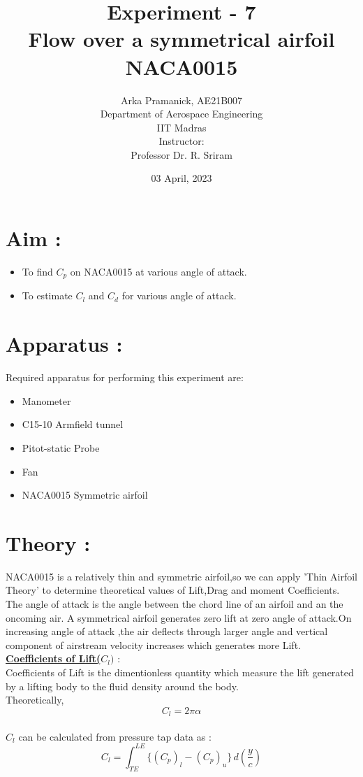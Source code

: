 \documentclass[12pt,a4paper]{article}
\title{{Experiment - 7\\ \textbf{Flow over a symmetrical airfoil NACA0015}}}
\author{Arka Pramanick, AE21B007\\ Department of Aerospace Engineering\\ IIT Madras\\[3ex] Instructor:\\ \large Professor Dr. R. Sriram}
\date{03 April, 2023}
\begin{document}
\maketitle

\hline

\section{Aim :}
\begin{itemize}
    \item To find $C_p$ on NACA0015 at various angle of attack.
    \item To estimate $C_l$ and $C_d$ for various angle of attack.
\end{itemize}


\section{Apparatus :}
Required apparatus for performing this experiment are:
\begin{itemize}
    \item Manometer
    \item C15-10 Armfield tunnel
    \item Pitot-static Probe
    \item Fan
    \item NACA0015 Symmetric airfoil
\end{itemize}



\newpage
\section{Theory :}

NACA0015 is a relatively thin and symmetric airfoil,so we can apply 'Thin Airfoil Theory' to determine theoretical values of Lift,Drag and moment Coefficients.
The angle of attack is the angle between the chord line of an airfoil and an the oncoming air. A symmetrical airfoil generates zero lift at zero angle of attack.On increasing angle of attack ,the air deflects through larger angle and vertical component of airstream velocity increases which generates more Lift.
\underline{\textbf{Coefficients of Lift($C_l)$}} :\\
Coefficients of Lift is the dimentionless quantity which measure the lift generated by a lifting body to the fluid density around the body.\\
Theoretically, $$C_l = 2 \pi\alpha$$ \\
$C_l$ can be calculated from pressure tap data as :
$$ C_l = \int_{TE}^{LE} \{(C_p)_{l} - (C_p)_{u}\} \,d(\frac{y}{c}) $$
\end{document}
